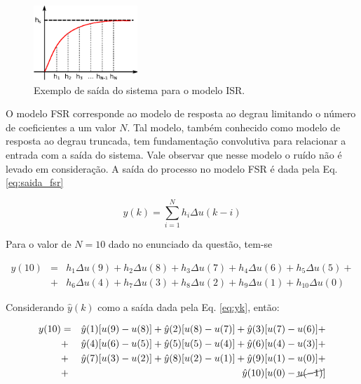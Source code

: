 \begin{figure}[htb]
\centering
    \includegraphics[width=0.35\textwidth]{imgs/questao1/isr}
    \caption{Exemplo de saída do sistema para o modelo ISR.}
    \label{fig:isr}
\end{figure}

O modelo FSR corresponde ao modelo de resposta ao degrau limitando o número de
coeficientes a um valor $N$. Tal modelo, também conhecido como modelo de
resposta ao degrau truncada, tem fundamentação convolutiva para relacionar a
entrada com a saída do sistema. Vale observar que nesse modelo o ruído não é
levado em consideração. A saída do processo no modelo FSR é dada pela Eq.
\ref{eq:saida_fsr}

\begin{equation}\label{eq:saida_fsr}
y(k) = \sum_{i=1}^N h_i\Delta u(k-i)
\end{equation}

Para o valor de $N = 10$ dado no enunciado da questão, tem-se

\begin{eqnarray}
y(10) & = & h_1\Delta u(9) + h_2\Delta u(8) + h_3\Delta u(7) + h_4\Delta u(6) +
            h_5\Delta u(5) + \nonumber\\ 
      & + & h_6\Delta u(4) + h_7\Delta u(3) + h_8\Delta u(2) + h_9\Delta u(1) + 
            h_{10}\Delta u(0)\nonumber
\end{eqnarray}

Considerando $\hat{y}(k)$ como a saída dada pela Eq. \ref{eq:yk}, então:

\begin{eqnarray}
y(10) & = & \hat{y}(1)[u(9)-u(8)] + 
            \hat{y}(2)[u(8)-u(7)] + 
            \hat{y}(3)[u(7)-u(6)] + \nonumber\\
      & + & \hat{y}(4)[u(6)-u(5)] +
            \hat{y}(5)[u(5)-u(4)] +
            \hat{y}(6)[u(4)-u(3)] + \nonumber\\
      & + & \hat{y}(7)[u(3)-u(2)] +
            \hat{y}(8)[u(2)-u(1)] +
            \hat{y}(9)[u(1)-u(0)] + \nonumber\\
      & + & \hat{y}(10)[u(0)-\cancel{u(-1)}] \nonumber
\end{eqnarray}

